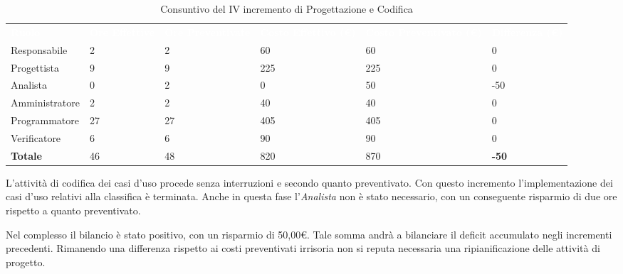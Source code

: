 \begin{table}[H]
\begin{center}
\renewcommand{\arraystretch}{1.5}
\begin{tabular}{ m{}<{\centering}  m{}<{\centering} m{}<{\centering} m{}<{\centering} m{}<{\centering} m{}<{\centering}}	\rowcolor{darkblue}
	\textcolor{white}{\textbf{Ruolo}} & \textcolor{white}{\textbf{Ore Effettive}} & \textcolor{white}{\textbf{Ore Preventivate}}&\textcolor{white}{\textbf{Costo Effettivo (\euro)}}&\textcolor{white}{\textbf{Costo Preventivato (\euro)}}&\textcolor{white}{\textbf{Differenza (\euro)}}\\ 

	Responsabile & 2 & 2 & 60 & 60 & 0\\	
	
	Progettista & 9 & 9 & 225 & 225 & 0\\
	
	Analista & 0 & 2 & 0 & 50 & -50\\
	
	Amministratore & 2 & 2 & 40 & 40 & 0\\
	
	Programmatore & 27 & 27 & 405 & 405 & 0\\
	
	Verificatore & 6 & 6 & 90 & 90 & 0\\
	
	\textbf{Totale} & 46 & 48 & 820 & 870 & \textbf{-50} \\
	
\end{tabular}
\caption{Consuntivo del IV incremento di Progettazione e Codifica}
\end{center}
\end{table}

L'attività di codifica dei casi d'uso procede senza interruzioni e secondo quanto preventivato. Con questo incremento l'implementazione dei casi d'uso relativi alla classifica è terminata. Anche in questa fase l'\textit{Analista} non è stato necessario, con un conseguente risparmio di due ore rispetto a quanto preventivato. 

Nel complesso il bilancio è stato positivo, con un risparmio di 50,00\euro. Tale somma andrà a bilanciare il deficit accumulato negli incrementi precedenti. Rimanendo una differenza rispetto ai costi preventivati irrisoria non si reputa necessaria una ripianificazione delle attività di progetto.

